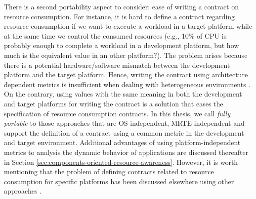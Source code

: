 \begin{itemize}
There is a second portability aspect to consider: ease of writing a contract on resource consumption.
For instance, it is hard to define a contract regarding resource consumption if we want to execute a workload in a target platform while at the same time we control the consumed resources (e.g., 10\% of CPU is probably enough to complete a workload in a development platform, but how much is the equivalent value in an other platform?).
The problem arises because there is a potential hardware/software mismatch between the development platform and the target platform.
Hence, writing the contract using architecture dependent metrics is insufficient when dealing with heterogeneous environments \cite{Daly2001, Dufour:2003:DMJ:949343.949320}.
On the contrary, using values with the same meaning in both the development and target platforms for writing the contract is a solution that eases the specification of resource consumption contracts.
In this thesis, we call \textit{fully portable} to those approaches that are OS independent, MRTE independent and support the definition of a contract using a common metric in the development and target environment.
Additional advantages of using platform-independent metrics to analysis the dynamic behavior of applications are discussed thereafter in Section \ref{sec:components-oriented-resource-awareness}.
However, it is worth mentioning that the problem of defining contracts related to resource consumption for specific platforms has been discussed elsewhere using other approaches \cite{Lambert200897, Pathak:2012:ESI:2168836.2168841}.




\end{itemize}

